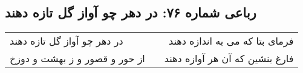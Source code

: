 \begin{center}
\section*{رباعی شماره ۷۶: در دهر چو آواز گل تازه دهند}
\label{sec:sh076}
\begin{longtable}{l p{0.5cm} r}
در دهر چو آواز گل تازه دهند
&&
فرمای بتا که می به اندازه دهند
\\
از حور و قصور و ز بهشت و دوزخ
&&
فارغ بنشین که آن هر آوازه دهند
\\
\end{longtable}
\end{center}

